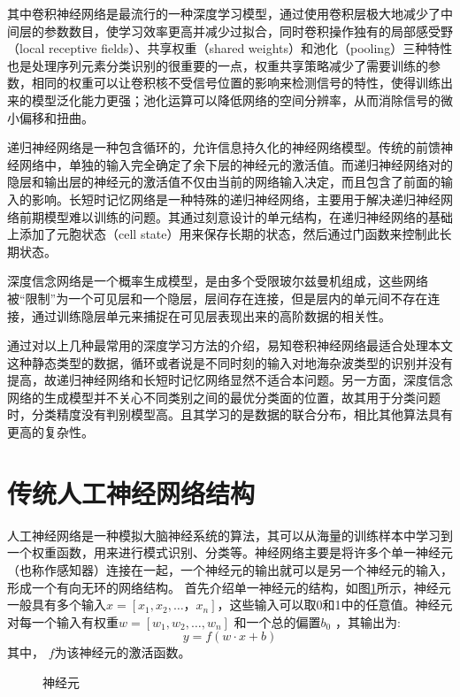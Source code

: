 其中卷积神经网络是最流行的一种深度学习模型，通过使用卷积层极大地减少了中间层的参数数目，使学习效率更高并减少过拟合，同时卷积操作独有的局部感受野（local receptive fields）、共享权重（shared weights）和池化（pooling）三种特性也是处理序列元素分类识别的很重要的一点，权重共享策略减少了需要训练的参数，相同的权重可以让卷积核不受信号位置的影响来检测信号的特性，使得训练出来的模型泛化能力更强；池化运算可以降低网络的空间分辨率，从而消除信号的微小偏移和扭曲。

递归神经网络是一种包含循环的，允许信息持久化的神经网络模型。传统的前馈神经网络中，单独的输入完全确定了余下层的神经元的激活值。而递归神经网络对的隐层和输出层的神经元的激活值不仅由当前的网络输入决定，而且包含了前面的输入的影响。长短时记忆网络是一种特殊的递归神经网络，主要用于解决递归神经网络前期模型难以训练的问题。其通过刻意设计的单元结构，在递归神经网络的基础上添加了元胞状态（cell state）用来保存长期的状态，然后通过门函数来控制此长期状态。

深度信念网络是一个概率生成模型，是由多个受限玻尔兹曼机组成，这些网络被“限制”为一个可见层和一个隐层，层间存在连接，但是层内的单元间不存在连接，通过训练隐层单元来捕捉在可见层表现出来的高阶数据的相关性。

通过对以上几种最常用的深度学习方法的介绍，易知卷积神经网络最适合处理本文这种静态类型的数据，循环或者说是不同时刻的输入对地海杂波类型的识别并没有提高，故递归神经网络和长短时记忆网络显然不适合本问题。另一方面，深度信念网络的生成模型并不关心不同类别之间的最优分类面的位置，故其用于分类问题时，分类精度没有判别模型高。且其学习的是数据的联合分布，相比其他算法具有更高的复杂性。

\section{传统人工神经网络结构}
\label{sec:neural}
人工神经网络是一种模拟大脑神经系统的算法，其可以从海量的训练样本中学习到一个权重函数，用来进行模式识别、分类等。神经网络主要是将许多个单一神经元（也称作感知器）连接在一起，一个神经元的输出就可以是另一个神经元的输入，形成一个有向无环的网络结构。
首先介绍单一神经元的结构，如图\ref{fig:neural}所示，神经元一般具有多个输入$x=[x_1,x_2,\dots，x_n] $，这些输入可以取0和1中的任意值。神经元对每一个输入有权重$w=[w_1,w_2,\dots,w_n] $ 和一个总的偏置$b_0$ ，其输出为:
\begin{equation}
  y = f(w\cdot x + b)
  \label{equ:neural}
\end{equation}
其中， $f$为该神经元的激活函数。

\begin{figure}[hbt]
  \centering   \sWuhao
  
  \caption{神经元}
  \label{fig:neural}
\end{figure}

